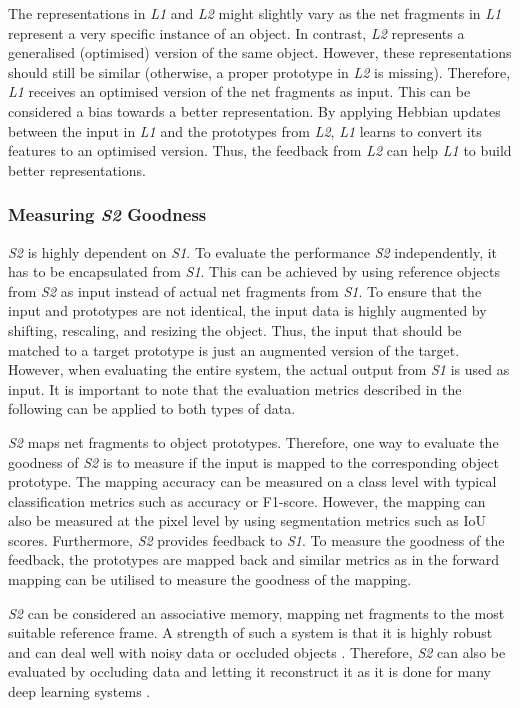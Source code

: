 The representations in \emph{L1} and \emph{L2} might slightly vary as the net fragments in \emph{L1} represent a very specific instance of an object. In contrast, \emph{L2} represents a generalised (optimised) version of the same object.
However, these representations should still be similar (otherwise, a proper prototype in \emph{L2} is missing).
Therefore, \emph{L1} receives an optimised version of the net fragments as input. This can be considered a bias towards a better representation.
By applying Hebbian updates between the input in \emph{L1} and the prototypes from \emph{L2}, \emph{L1} learns to convert its features to an optimised version.
Thus, the feedback from \emph{L2} can help \emph{L1} to build better representations.






\subsubsection{Measuring \emph{S2} Goodness}
\emph{S2} is highly dependent on \emph{S1}. To evaluate the performance \emph{S2} independently, it has to be encapsulated from \emph{S1}.
This can be achieved by using reference objects from \emph{S2} as input instead of actual net fragments from \emph{S1}.
To ensure that the input and prototypes are not identical, the input data is highly augmented by shifting, rescaling, and resizing the object.
Thus, the input that should be matched to a target prototype is just an augmented version of the target.
However, when evaluating the entire system, the actual output from \emph{S1} is used as input.
It is important to note that the evaluation metrics described in the following can be applied to both types of data.

\emph{S2} maps net fragments to object prototypes. Therefore, one way to evaluate the goodness of \emph{S2} is to measure if the input is mapped to the corresponding object prototype.
The mapping accuracy can be measured on a class level with typical classification metrics such as accuracy or F1-score.
However, the mapping can also be measured at the pixel level by using segmentation metrics such as IoU scores.
Furthermore, \emph{S2} provides feedback to \emph{S1}.
To measure the goodness of the feedback, the prototypes are mapped back and similar metrics as in the forward mapping can be utilised to measure the goodness of the mapping.

\emph{S2} can be considered an associative memory, mapping net fragments to the most suitable reference frame.
A strength of such a system is that it is highly robust and can deal well with noisy data or occluded objects .
Therefore, \emph{S2} can also be evaluated by occluding data and letting it reconstruct it as it is done for many deep learning systems . 

